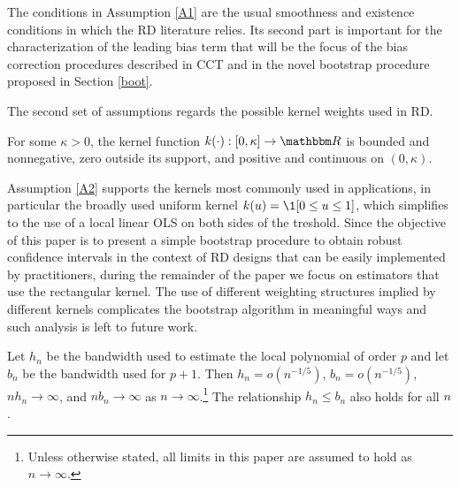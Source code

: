 \documentclass[12pt,fleqn]{article}
\begin{document}
The conditions in Assumption \ref{A1} are the usual smoothness and existence conditions in which the RD literature relies. Its second part is important for the characterization of the leading bias term that will be the focus of the bias correction procedures described in CCT and in the novel  bootstrap procedure proposed in Section \ref{boot}.

The second set of assumptions regards the possible kernel weights used in RD.

\begin{assumption}[Kernel]\label{A2}
 For some $\kappa>0$, the kernel function $k(\cdot):[0, \kappa] \rightarrow \RR$ is bounded and nonnegative, zero outside its support, and positive and continuous on $(0, \kappa)$.
\end{assumption}

Assumption \ref{A2} supports the kernels most commonly used in applications, in particular the broadly used uniform kernel $k(u)=\1[0\leq u\leq 1]$, which simplifies to the use of a local linear OLS on both sides of the treshold. Since the objective of this paper is to present a simple bootstrap procedure to obtain robust confidence intervals in the context of RD designs that can be easily implemented by practitioners, during the remainder of the paper we focus on estimators that use the rectangular kernel. The use of different weighting structures implied by different kernels complicates the bootstrap algorithm in meaningful ways and such analysis is left to future work.

\begin{assumption}[Bandwidth]\label{A3}
  Let $h_n$ be the bandwidth used to estimate the local polynomial of
  order $p$ and let $b_n$ be the bandwidth used for $p+1$. Then
  $h_n = o(n^{-1/5})$, $b_n = o(n^{-1/5})$, $n h_n \to \infty$, and
  $n b_n \to \infty$ as $n \to \infty$.\footnote{%
    Unless otherwise stated, all limits in this paper are assumed to
    hold as $n \to \infty$.} %
  The relationship $h_n \leq b_n$ also holds for all $n$.
\end{assumption}
\end{document}

